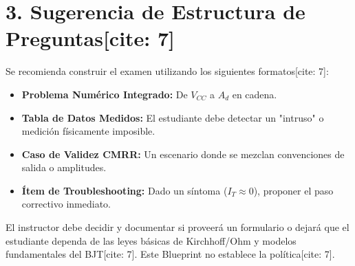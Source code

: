 \documentclass[11pt, a4paper]{article}
\begin{document}
\section*{3. Sugerencia de Estructura de Preguntas[cite: 7]}
Se recomienda construir el examen utilizando los siguientes formatos[cite: 7]:
\begin{itemize}
    \item \textbf{Problema Numérico Integrado:} De $V_{CC}$ a $A_d$ en cadena.
    \item \textbf{Tabla de Datos Medidos:} El estudiante debe detectar un "intruso" o medición físicamente imposible.
    \item \textbf{Caso de Validez CMRR:} Un escenario donde se mezclan convenciones de salida o amplitudes.
    \item \textbf{Ítem de Troubleshooting:} Dado un síntoma ($I_T \approx 0$), proponer el paso correctivo inmediato.
\end{itemize}

\vspace{0.5cm}
\begin{tcolorbox}[colback=yellow!10, colframe=orange, title=\textbf{Decisión Pendiente: Formulario y Supuestos}]
    El instructor debe decidir y documentar si proveerá un formulario o dejará que el estudiante dependa de las leyes básicas de Kirchhoff/Ohm y modelos fundamentales del BJT[cite: 7]. Este Blueprint no establece la política[cite: 7].
\end{tcolorbox}
\end{document}
